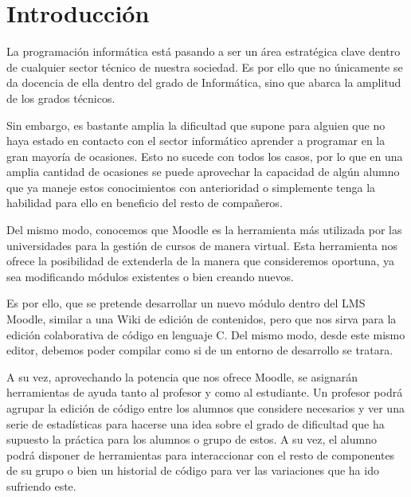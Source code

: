 \chapter[Introducción]{\label{}
Introducción}

La programación informática está pasando a ser un área estratégica clave dentro de cualquier sector técnico de nuestra sociedad. Es por ello que no únicamente se da docencia de ella dentro del grado de Informática, sino que abarca la amplitud de los grados técnicos.

Sin embargo, es bastante amplia la dificultad que supone para alguien que no haya estado en contacto con el sector informático aprender a programar en la gran mayoría de ocasiones. Esto no sucede con todos los casos, por lo que en una amplia cantidad de ocasiones se puede aprovechar la capacidad de algún alumno que ya maneje estos conocimientos con anterioridad o simplemente tenga la habilidad para ello en beneficio del resto de compañeros.

Del mismo modo, conocemos que Moodle es la herramienta más utilizada por las universidades para la gestión de cursos de manera virtual. Esta herramienta nos ofrece la posibilidad de extenderla de la manera que consideremos oportuna, ya sea modificando módulos existentes o bien creando nuevos.

Es por ello, que se pretende desarrollar un nuevo módulo dentro del LMS Moodle, similar a una Wiki de edición de contenidos, pero que nos sirva para la edición colaborativa de código en lenguaje C. Del mismo modo, desde este mismo editor, debemos poder compilar como si de un entorno de desarrollo se tratara.

A su vez, aprovechando la potencia que nos ofrece Moodle, se asignarán herramientas de ayuda tanto al profesor y como al estudiante. Un profesor podrá agrupar la edición de código entre los alumnos que considere necesarios y ver una serie de estadísticas para hacerse una idea sobre el grado de dificultad que ha supuesto la práctica para los alumnos o grupo de estos. A su vez, el alumno podrá disponer de herramientas para interaccionar con el resto de componentes de su grupo o bien un historial de código para ver las variaciones que ha ido sufriendo este.
